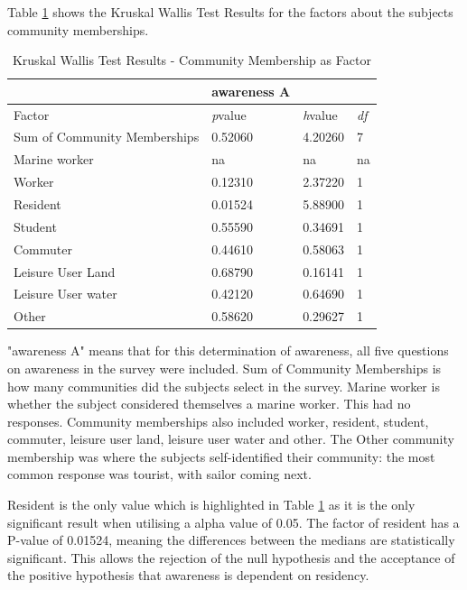 Table \ref{kw_test_com_membership} shows the Kruskal Wallis Test Results for the factors about the subjects community memberships. 


\begin{table}[H]
    \centering
    \begin{tabular}{|l|l|l|l|}
    \hline
         ~ & \textbf{awareness A} & ~ & ~ \\ \hline
        Factor &\textit{p}value &\textit{h}value & \textit{df} \\ \hline
        Sum of Community Memberships & 0.52060 & 4.20260 & 7 \\ \hline
        Marine worker & na & na & na \\ \hline
        Worker & 0.12310 & 2.37220 & 1 \\ \hline
        Resident & \cellcolor[HTML]{7df9ff} 0.01524 & 5.88900 & 1 \\ \hline
        Student & 0.55590 & 0.34691 & 1 \\ \hline
        Commuter & 0.44610 & 0.58063 & 1 \\ \hline
        Leisure User Land & 0.68790 & 0.16141 & 1 \\ \hline
        Leisure User water & 0.42120 & 0.64690 & 1 \\ \hline
        Other & 0.58620 & 0.29627 & 1 \\ \hline
    \end{tabular}
    \caption{Kruskal Wallis Test Results - Community Membership as Factor}{ "awareness A" means that for this determination of awareness, all five questions on awareness in the survey were included. Sum of Community Memberships is how many communities did the subjects select in the survey. Marine worker is whether the subject considered themselves a marine worker. This had no responses. Community memberships also included worker, resident, student, commuter, leisure user land, leisure user water and other. The Other community membership was where the subjects self-identified their community: the most common response was tourist, with sailor coming next. }
    \label{kw_test_com_membership}
\end{table}
Resident is the only value which is highlighted in Table \ref{kw_test_com_membership} as it is the only significant result when utilising a alpha value of 0.05. The factor of resident has a P-value of 0.01524, meaning the differences between the medians are statistically significant. This allows the rejection of the null hypothesis and the acceptance of the positive hypothesis that awareness is dependent on residency. 
